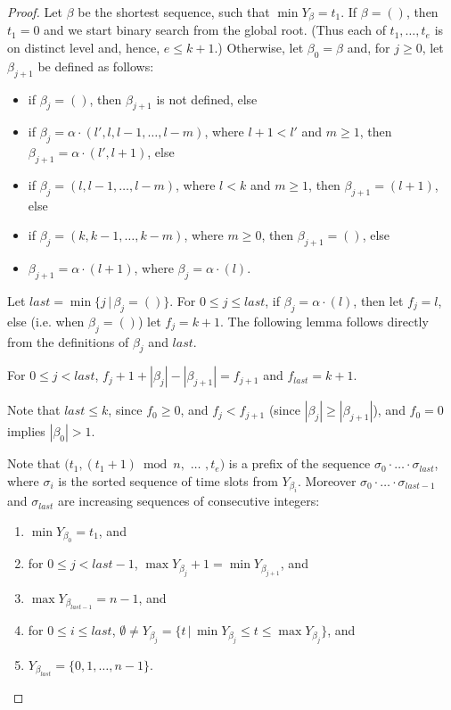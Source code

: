 \documentclass{llncs}
\begin{document}
\begin{proof}
Let $\beta$ be the shortest sequence, such that $\min Y_\beta= t_1$.
If $\beta=()$, then $t_1=0$ and we start binary search from the global root.
(Thus each of $t_1, \ldots, t_{e}$ is on distinct level and, hence, $e\le k+1$.)
Otherwise, %
let $\beta_0=\beta$ and, for $j\ge 0$, let $\beta_{j+1}$ be defined
as follows:
\begin{itemize}
\item 
  if $\beta_j=()$, then $\beta_{j+1}$ is not defined, 
  else
\item 
  if $\beta_j=\alpha\cdot (l',l, l-1,\ldots, l-m)$,
  where $l+1<l'$ and $m\ge 1$, 
  then $\beta_{j+1}=\alpha\cdot(l',l+1)$, 
  else
\item 
  if $\beta_j=(l,l-1,\ldots,l-m)$,
  where $l<k$ and  $m\ge 1$,
  then $\beta_{j+1}=(l+1)$, 
  else
\item 
  if $\beta_j=(k,k-1,\ldots,k-m)$,
  where $m\ge 0$,
  then $\beta_{j+1}=()$, 
  else
\item 
  $\beta_{j+1}=\alpha\cdot (l+1)$, 
  where $\beta_j=\alpha\cdot (l)$.

\end{itemize}
Let $last=\min\{j\,|\, \beta_j=()\}$.
For $0\le j\le last$,
if $\beta_j=\alpha\cdot(l)$, then let $f_j=l$,
else (i.e. when $\beta_j=()$) let $f_j=k+1$.
The following lemma follows directly from the definitions of $\beta_j$ and $last$.
\begin{lemma}\label{foot-increasing-lemma}
For $0\le j<last$, $f_j+1+|\beta_j|-|\beta_{j+1}|= f_{j+1}$ and $f_{last}= k+1$.
\end{lemma}
Note that $last\le k$, since $f_0\ge 0$, and $f_j<f_{j+1}$ (since $|\beta_j|\ge |\beta_{j+1}|$), 
and $f_0=0$ implies $|\beta_0|>1$.

Note that $(t_1,(t_1+1)\bmod n,$ $\ldots$ $, t_e)$ is a prefix of the sequence
$\sigma_0\cdot\ldots\cdot\sigma_{last}$, 
where $\sigma_i$ is the sorted sequence of time slots from $Y_{\beta_i}$.
Moreover $\sigma_0\cdot\ldots\cdot\sigma_{last-1}$ and $\sigma_{last}$ are
increasing sequences of consecutive integers:
\begin{lemma}\label{Y-beta-decomposition}
\begin{enumerate}
\item
  $\min Y_{\beta_0}=t_1$, 
  and
\item
  for $0\le j<last-1$,
  $\max Y_{\beta_{j}}+1 = \min Y_{\beta_{j+1}}$, 
  and
\item
  $\max Y_{\beta_{last-1}}=n-1$, 
  and
\item
  for $0\le i\le last$,
  $\emptyset\not=Y_{\beta_{j}} = \{t\,|\,\min Y_{\beta_{j}}\le t\le \max Y_{\beta_{j}}\}$,
  and
\item
  $Y_{\beta_{last}}=\{0,1,\ldots,n-1\}$.
\end{enumerate}
\end{lemma}


\end{proof}
\end{document}
